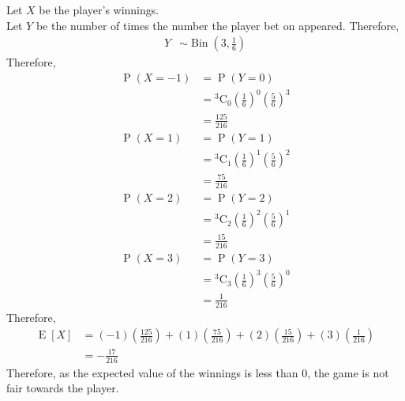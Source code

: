 \documentclass[titlepage, fleqn, a4paper, 12pt, twoside]{article}
\theoremstyle{definition}
\theoremstyle{theorem}
\DeclareMathOperator{\prob}{\mathrm{P}}
\DeclareMathOperator{\expct}{\mathrm{E}}
\DeclareMathOperator{\bin}{\mathrm{Bin}}
\newcommand*{\comb}[2]{{}^{#1}\mathrm{C}_{#2}}%
\begin{document}
\begin{solution}
	Let $X$ be the player's winnings.\\
	Let $Y$ be the number of times the number the player bet on appeared.
	Therefore,
	\begin{align*}
		Y & \sim \bin\left( 3,\frac{1}{6} \right)
	\end{align*}
	Therefore,
	\begin{align*}
		\prob(X = -1) & = \prob(Y = 0)                                                          \\
                              & = \comb{3}{0} \left( \frac{1}{6} \right)^0 \left( \frac{5}{6} \right)^3 \\
                              & = \frac{125}{216}                                                       \\
		\prob(X = 1)  & = \prob(Y = 1)                                                          \\
                              & = \comb{3}{1} \left( \frac{1}{6} \right)^1 \left( \frac{5}{6} \right)^2 \\
                              & = \frac{75}{216}                                                        \\
		\prob(X = 2)  & = \prob(Y = 2)                                                          \\
                              & = \comb{3}{2} \left( \frac{1}{6} \right)^2 \left( \frac{5}{6} \right)^1 \\
                              & = \frac{15}{216}                                                        \\
		\prob(X = 3)  & = \prob(Y = 3)                                                          \\
                              & = \comb{3}{3} \left( \frac{1}{6} \right)^3 \left( \frac{5}{6} \right)^0 \\
                              & = \frac{1}{216}
	\end{align*}
	Therefore,
	\begin{align*}
		\expct[X] & = (-1) \left( \frac{125}{216} \right) + (1) \left( \frac{75}{216} \right) + (2) \left( \frac{15}{216} \right) + (3) \left( \frac{1}{216} \right) \\
                          & = -\frac{17}{216}
	\end{align*}
	Therefore, as the expected value of the winnings is less than $0$, the game is not fair towards the player.
\end{solution}
\end{document}
